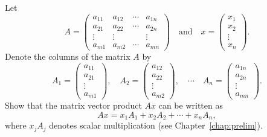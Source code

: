 \documentclass{ximera}
\begin{document}
\begin{exercise} \label{c4.1.b3}
Let
\[
A=\left(
\begin{array}{rrrr}
 a_{11} & a_{12} & \cdots & a_{1n} \\
 a_{21} & a_{22} & \cdots & a_{2n}  \\
 \vdots & \vdots &        & \vdots  \\
 a_{m1} & a_{m2} & \cdots & a_{mn}
\end{array}
\right)\quad\mbox{and}\quad
x =
\left( \begin{array}{r} x_1\\ x_2\\ \vdots\\ x_n\end{array}\right).
\]
Denote the columns of the matrix $A$ by
\[
A_1 =
\left(\begin{array}{c} a_{11}\\ a_{21}\\ \vdots\\
a_{m1}\end{array}\right),\quad
A_2 =
\left(\begin{array}{c} a_{12}\\ a_{22}\\ \vdots\\
a_{m2}\end{array}\right),\quad
\cdots\quad
A_n =
\left(\begin{array}{c} a_{1n}\\ a_{2n}\\ \vdots\\ a_{mn}\end{array}\right).
\]
Show that the matrix vector product $Ax$ can be written as
\[
Ax = x_1 A_1 + x_2 A_2 + \cdots + x_n A_n,
\]
where $x_j A_j$ denotes scalar multiplication (see Chapter~\ref{chap:prelim}).

\begin{solution}


\end{solution}
\end{exercise}
\end{document}
